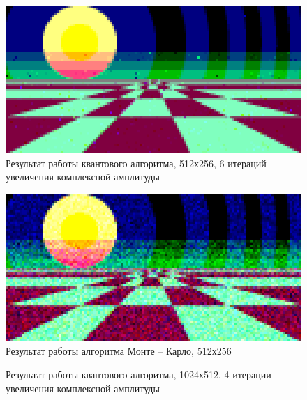\begin{figure}[H]
	\begin{center}
		\includegraphics[scale=0.9]{img/prog_res/qss-512-6.png}
	\end{center}
	\captionsetup{justification=centering}
	\caption{Результат работы квантового алгоритма, 512х256, 6 итераций увеличения комплексной амплитуды}
	\label{img:example_02}
\end{figure}

\begin{figure}[H]
	\begin{center}
		\includegraphics[scale=0.9]{img/prog_res/monte-carlo-512-4.png}
	\end{center}
	\captionsetup{justification=centering}
	\caption{Результат работы алгоритма Монте -- Карло, 512х256}
	\label{img:example_01-mc}
\end{figure}

\begin{figure}[H]
	\begin{center}
	\end{center}
	\captionsetup{justification=centering}
	\caption{Результат работы квантового алгоритма, 1024х512, 4 итерации увеличения комплексной амплитуды}
	\label{img:example_03}
\end{figure}

